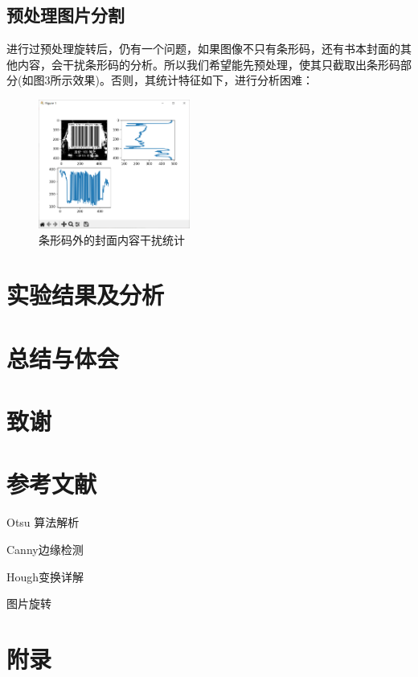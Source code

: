 \documentclass{ctexart}
\begin{document}
\subsection{预处理图片分割}
进行过预处理旋转后，仍有一个问题，如果图像不只有条形码，还有书本封面的其他内容，会干扰条形码的分析。所以我们希望能先预处理，使其只截取出条形码部分(如图3所示效果)。否则，其统计特征如下，进行分析困难：
\begin{figure}[H]
    \centering
    \includegraphics[height=120pt]{isbn_beforeCut}
    \caption{条形码外的封面内容干扰统计}
\end{figure}


\section{实验结果及分析}
\section{总结与体会}
\section{致谢}
\section{参考文献}
Otsu 算法解析

Canny边缘检测

Hough变换详解

图片旋转

\section{附录}
\end{document}
